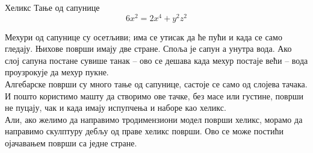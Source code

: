 \begin{surferPage}{Хеликс}
Тање од сапунице\\
  \smallskip
\[6x^2	= 2x^4	+ y^2	z^2\]

\singlespacing
Мехури од сапунице су осетљиви; има се утисак да ће пући и када се само гледају. Њихове површи имају две стране. Споља је сапун а унутра вода. Ако слој сапуна постане сувише танак – ово се дешава када мехур постаје већи – вода проузрокује да мехур пукне.\\
\vspace{0,3cm}
Алгебарске површи су много тање од сапунице, састоје се само од слојева тачака. И пошто користимо машту да створимо ове тачке, без масе или густине, површи не пуцају, чак и када имају испупчења и наборе као хеликс.\\
\vspace{0,3cm}
Али, ако желимо да направимо тродимензиони модел површи хеликс, морамо да направимо скулптуру дебљу од праве хеликс површи. Ово се може постићи ојачавањем површи са једне стране.
\end{surferPage}
